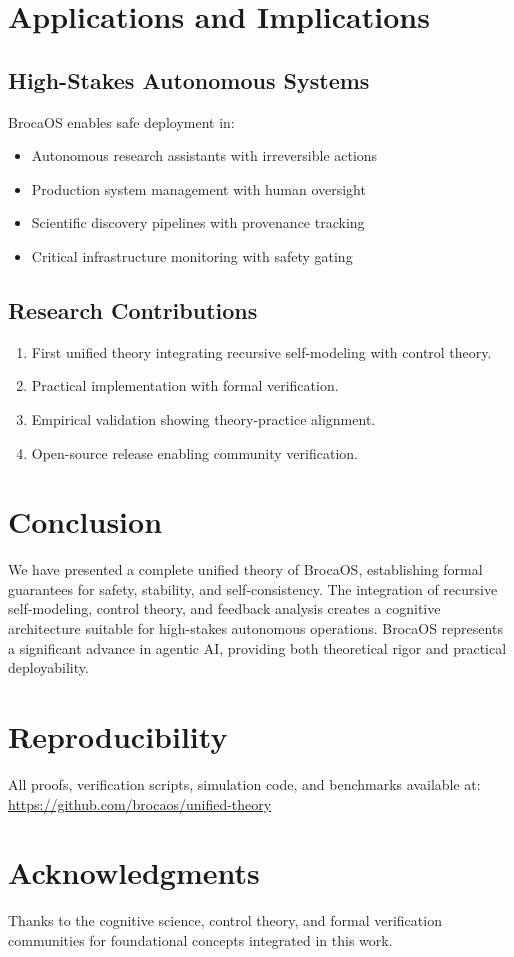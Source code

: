 \documentclass[12pt]{article}
\theoremstyle{definition}
\begin{document}
\section{Applications and Implications}

\subsection{High-Stakes Autonomous Systems}

BrocaOS enables safe deployment in:
\begin{itemize}
    \item Autonomous research assistants with irreversible actions
    \item Production system management with human oversight
    \item Scientific discovery pipelines with provenance tracking
    \item Critical infrastructure monitoring with safety gating
\end{itemize}

\subsection{Research Contributions}

\begin{enumerate}
    \item First unified theory integrating recursive self-modeling with control theory.
    \item Practical implementation with formal verification.
    \item Empirical validation showing theory-practice alignment.
    \item Open-source release enabling community verification.
\end{enumerate}

\section{Conclusion}

We have presented a complete unified theory of BrocaOS, establishing formal guarantees for safety, stability, and self-consistency. The integration of recursive self-modeling, control theory, and feedback analysis creates a cognitive architecture suitable for high-stakes autonomous operations. BrocaOS represents a significant advance in agentic AI, providing both theoretical rigor and practical deployability.

\section*{Reproducibility}

All proofs, verification scripts, simulation code, and benchmarks available at:
\url{https://github.com/brocaos/unified-theory}

\section*{Acknowledgments}

Thanks to the cognitive science, control theory, and formal verification communities for foundational concepts integrated in this work.
\end{document}
